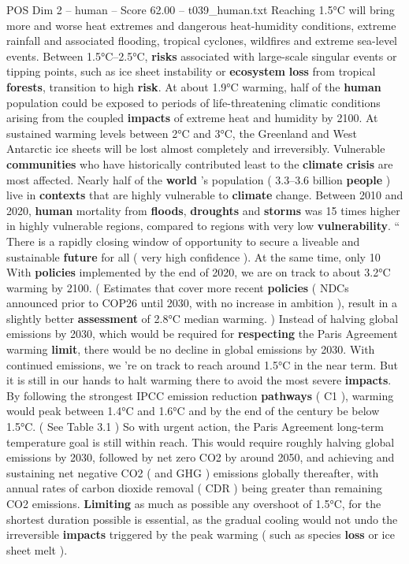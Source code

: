 \begin{textsample}{POS Dim 2 – human – Score 62.00 – t039\_human.txt}
Reaching 1.5°C will bring more and worse heat extremes and dangerous heat-humidity conditions, extreme rainfall and associated flooding, tropical cyclones, wildfires and extreme sea-level events.
Between 1.5°C–2.5°C, \textbf{risks} associated with large-scale singular events or tipping points, such as ice sheet instability or \textbf{ecosystem} \textbf{loss} from tropical \textbf{forests}, transition to high \textbf{risk}.
At about 1.9°C warming, half of the \textbf{human} population could be exposed to periods of life-threatening climatic conditions arising from the coupled \textbf{impacts} of extreme heat and humidity by 2100.
At sustained warming levels between 2°C and 3°C, the Greenland and West Antarctic ice sheets will be lost almost completely and irreversibly.
Vulnerable \textbf{communities} who have historically contributed least to the \textbf{climate} \textbf{crisis} are most affected.
Nearly half of the \textbf{world} ’s population ( 3.3–3.6 billion \textbf{people} ) live in \textbf{contexts} that are highly vulnerable to \textbf{climate} change.
Between 2010 and 2020, \textbf{human} mortality from \textbf{floods}, \textbf{droughts} and \textbf{storms} was 15 times higher in highly vulnerable regions, compared to regions with very low \textbf{vulnerability}. “ There is a rapidly closing window of opportunity to secure a liveable and sustainable \textbf{future} for all ( very high confidence ).
At the same time, only 10 %
With \textbf{policies} implemented by the end of 2020, we are on track to about 3.2°C warming by 2100. ( Estimates that cover more recent \textbf{policies} ( NDCs announced prior to COP26 until 2030, with no increase in ambition ), result in a slightly better \textbf{assessment} of 2.8°C median warming. ) Instead of halving global emissions by 2030, which would be required for \textbf{respecting} the Paris Agreement warming \textbf{limit}, there would be no decline in global emissions by 2030.
With continued emissions, we ’re on track to reach around 1.5°C in the near term.
But it is still in our hands to halt warming there to avoid the most severe \textbf{impacts}.
By following the strongest IPCC emission reduction \textbf{pathways} ( C1 ), warming would peak between 1.4°C and 1.6°C and by the end of the century be below 1.5°C. ( See Table 3.1 ) So with urgent action, the Paris Agreement long-term temperature goal is still within reach.
This would require roughly halving global emissions by 2030, followed by net zero CO2 by around 2050, and achieving and sustaining net negative CO2 ( and GHG ) emissions globally thereafter, with annual rates of carbon dioxide removal ( CDR ) being greater than remaining CO2 emissions. \textbf{Limiting} as much as possible any overshoot of 1.5°C, for the shortest duration possible is essential, as the gradual cooling would not undo the irreversible \textbf{impacts} triggered by the peak warming ( such as species \textbf{loss} or ice sheet melt ).

\end{textsample}
